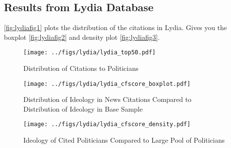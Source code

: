 \documentclass[12pt, letterpaper]{article}
\begin{document}


\clearpage

\subsection{Results from Lydia Database}

\label{si_lydia_res}
\ref{fig:lydiafig1} plots the distribution of the citations in Lydia. Gives you the boxplot \ref{fig:lydiafig2} and density plot \ref{fig:lydiafig3}.

 \begin{figure}[h]
   \centering
   \caption{Distribution of Citations to Politicians}
   \texttt{[image: ../figs/lydia/lydia\_top50.pdf]}
   \label{fig:top50_lydia}
 \end{figure}

 \begin{figure}[h]
   \centering
   \caption{Distribution of Ideology in News Citations Compared to Distribution of Ideology in Base Sample}
   \texttt{[image: ../figs/lydia/lydia\_cfscore\_boxplot.pdf]}
   \label{fig:cfscore_box_lydia}
 \end{figure}

 \begin{figure}[h]
   \centering
   \caption{Ideology of Cited Politicians Compared to Large Pool of Politicians}
   \texttt{[image: ../figs/lydia/lydia\_cfscore\_density.pdf]}
   \label{fig:cfscore_density_lydia}
 \end{figure}
\clearpage
\end{document}
